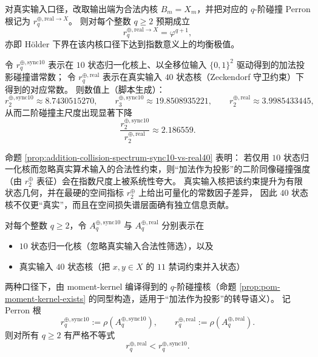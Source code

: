 \begin{conjecture}\label{conj:addition-collision-legal-output-equilibrium}
对真实输入口径，改取输出端为合法内核 \(B_m=X_m\)，并把对应的 \(q\)-阶碰撞 Perron 根记为 \(r_{q}^{\oplus,\mathrm{real}\to X}\)。
则对每个整数 \(q\ge 2\) 预期成立
\[
r_{q}^{\oplus,\mathrm{real}\to X}=\varphi^{q+1},
\]
亦即 Hölder 下界在该内核口径下达到指数意义上的均衡极值。
\end{conjecture}

\begin{proposition}\label{prop:addition-collision-spectrum-sync10-vs-real40}
令 \(r_q^{\oplus,\mathrm{sync10}}\) 表示在 $10$ 状态归一化核上、以全移位输入 \(\{0,1\}^2\) 驱动得到的加法投影碰撞谱常数；
令 \(r_q^{\oplus,\mathrm{real}}\) 表示在真实输入 \(40\) 状态核（Zeckendorf 守卫约束）下得到的对应常数。
则数值上（脚本生成）：
\[
r_2^{\oplus,\mathrm{sync10}}\approx 8.7430515270,\qquad
r_3^{\oplus,\mathrm{sync10}}\approx 19.8508935221,\qquad
r_2^{\oplus,\mathrm{real}}\approx 3.9985433445,
\]
从而二阶碰撞主尺度出现显著下降
\[
\frac{r_2^{\oplus,\mathrm{sync10}}}{r_2^{\oplus,\mathrm{real}}}\approx 2.186559.
\]
\end{proposition}

\begin{remark}
\label{rem:addition-collision-spectrum-interpretation}
命题 \ref{prop:addition-collision-spectrum-sync10-vs-real40} 表明：
若仅用 $10$ 状态归一化核而忽略真实算术输入的合法性约束，则“加法作为投影”的二阶同像碰撞强度（由 \(r_2^{\oplus}\) 表征）会在指数尺度上被系统性夸大。
真实输入核把该约束提升为有限状态几何，并在最硬的空间指标 \(r_2^{\oplus}\) 上给出可量化的常数因子差异，
因此 \(40\) 状态核不仅更“真实”，而且在空间损失谱层面确有独立信息贡献。
\end{remark}

\begin{theorem}\label{thm:addition-collision-perron-drop-real-vs-sync}
对每个整数 \(q\ge 2\)，令 \(A^{\oplus,\mathrm{sync10}}_q\) 与 \(A^{\oplus,\mathrm{real}}_q\) 分别表示在
\begin{itemize}
  \item \(10\) 状态归一化核（忽略真实输入合法性筛选），以及
  \item 真实输入 \(40\) 状态核（把 \(x,y\in X\) 的 \(11\) 禁词约束并入状态）
\end{itemize}
两种口径下，由 moment-kernel 编译得到的 \(q\)-阶碰撞核（命题 \ref{prop:pom-moment-kernel-exists} 的同型构造，适用于“加法作为投影”的转导语义）。
记 Perron 根
\[
r_q^{\oplus,\mathrm{sync10}}:=\rho\!\left(A^{\oplus,\mathrm{sync10}}_q\right),
\qquad
r_q^{\oplus,\mathrm{real}}:=\rho\!\left(A^{\oplus,\mathrm{real}}_q\right).
\]
则对所有 \(q\ge 2\) 有严格不等式
\[
\boxed{\; r_q^{\oplus,\mathrm{real}}<r_q^{\oplus,\mathrm{sync10}}.\;}
\]
\end{theorem}

